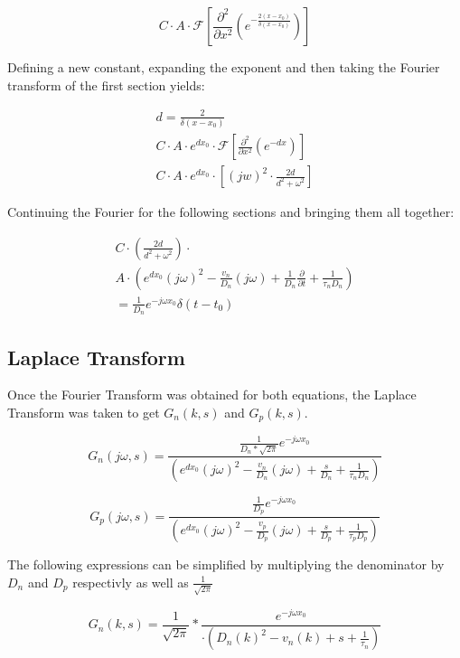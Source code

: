 \documentclass[
  journal,
]{IEEEtran}%
\begin{document}
\[
C \cdot A \cdot \mathcal{F} \left[ \frac{\partial^2}{\partial x^2}
\left( e^{-\frac{2(x - x_0)}{\delta(x - x_0)}} \right) \right]
\]

Defining a new constant, expanding the exponent and then taking the
Fourier transform of the first section yields:

\[
\begin{multlined}
d = {\frac{2}{\delta(x-x_0)}}
\\
C \cdot A \cdot e^{dx_0} \cdot \mathcal{F} \left[ \frac{\partial^2}{\partial x^2}
\left( e^{-dx} \right) \right]
\\
C \cdot A \cdot e^{dx_0} \cdot [(jw)^2 \cdot \frac{2d}{d^2+\omega^2}]
\end{multlined}
\]

Continuing the Fourier for the following sections and bringing them all
together:

\[
\begin{multlined}
C \cdot \left( \frac{2d}{d^2 + \omega^2} \right) \cdot 
\\
A \cdot
\left(
e^{d x_0} (j \omega)^2
- \frac{v_n}{D_n} (j \omega)
+ \frac{1}{D_n} \frac{\partial}{\partial t}
+ \frac{1}{\tau_n D_n}
\right)
\\
= \frac{1}{D_n} e^{-j \omega x_0} \delta(t - t_0)
\end{multlined}
\]

\subsection{Laplace Transform}\label{laplace-transform}

Once the Fourier Transform was obtained for both equations, the Laplace
Transform was taken to get \(G_n(k,s)\) and \(G_p(k,s)\).

\[
G_n(j \omega, s) = \frac{
\frac{1}{D_n*\sqrt{2\pi}} e^{-j \omega x_0}}{
 \left(e^{d x_0} (j \omega)^2
- \frac{v_n}{D_n} (j \omega)
+ \frac{s}{D_n}
+ \frac{1}{\tau_n D_n}
\right)}
\]

\[
G_p(j \omega, s) = \frac{
\frac{1}{D_p} e^{-j \omega x_0}}{
\left(e^{d x_0} (j \omega)^2
- \frac{v_p}{D_p} (j \omega)
+ \frac{s}{D_p}
+ \frac{1}{\tau_p D_p}
\right)}
\]

The following expressions can be simplified by multiplying the
denominator by \(D_n\) and \(D_p\) respectivly as well as
\(\frac{1}{\sqrt{2\pi}}\)

\[
G_n(k, s) = \frac{1}{\sqrt{2\pi}} * \frac{
e^{-j \omega x_0}}{
\cdot \left(D_n(k)^2
- v_n (k)
+ s
+ \frac{1}{\tau_n}
\right)}
\]
\end{document}
